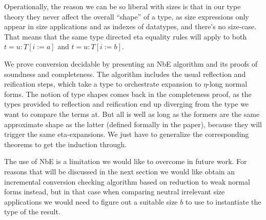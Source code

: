 \documentclass{book}
\begin{document}
Operationally, the reason we can be so liberal with sizes is that in our
type theory they never affect the overall ``shape'' of a type, as size
expressions only appear in size applications and as indexes of
datatypes, and there's no size-case. That means that the same type
directed eta equality rules will apply to both $t = u : T[i:=a]$ and
$t = u : T[i:=b]$.

We prove conversion decidable by presenting an NbE algorithm and its
proofs of soundness and completeness. The algorithm includes the usual
reflection and reification steps, which take a type to orchestrate
expansion to $\eta$-long normal forms.  The notion of type shapes comes
back in the completeness proof, as the types provided to reflection
and reification end up diverging from the type we want to compare the
terms at.  But all is well as long as the formers are the same
approximate shape as the latter (defined formally in the paper),
because they will trigger the same eta-expansions.  We just have to
generalize the corresponding theorems to get the induction through.

The use of NbE is a limitation we would like to overcome in future
work. For reasons that will be discussed in the next section we would
like obtain an incremental conversion checking algorithm based on
reduction to weak normal forms instead, but in that case when
comparing neutral irrelevant size applications we would need to figure
out a suitable size $b$ to use to instantiate the type of the result.


\end{document}
